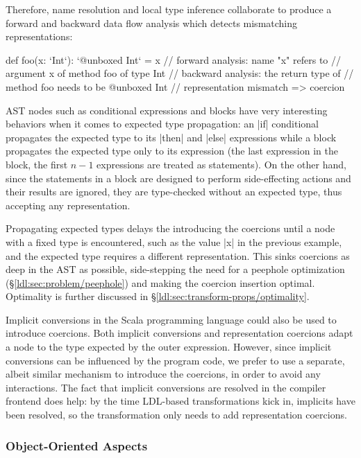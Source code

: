 Therefore, name resolution and local type inference collaborate to produce a forward and backward data flow analysis which detects mismatching representations:

\begin{lstlisting-nobreak}
 def foo(x: `Int`):  `@unboxed Int` =
   x // forward analysis: name "x" refers to
      //     argument x of method foo of type Int
      // backward analysis: the return type of
      //     method foo needs to be @unboxed Int
      // representation mismatch => coercion
\end{lstlisting-nobreak}

AST nodes such as conditional expressions and blocks have very interesting behaviors when it comes to expected type propagation: an |if| conditional propagates the expected type to its |then| and |else| expressions while a block propagates the expected type only to its expression (the last expression in the block, the first $n-1$ expressions are treated as statements). On the other hand, since the statements in a block are designed to perform side-effecting actions and their results are ignored, they are type-checked without an expected type, thus accepting any representation.

Propagating expected types delays the introducing the coercions until a node with a fixed type is encountered, such as the value |x| in the previous example, and the expected type requires a different representation. This sinks coercions as deep in the AST as possible, side-stepping the need for a peephole optimization (\S\ref{ldl:sec:problem/peephole}) and making the coercion insertion optimal. Optimality is further discussed in \S\ref{ldl:sec:transform-props/optimality}.

Implicit conversions in the Scala programming language could also be used to introduce coercions. Both implicit conversions and representation coercions adapt a node to the type expected by the outer expression. However, since implicit conversions can be influenced by the program code, we prefer to use a separate, albeit similar mechanism to introduce the coercions, in order to avoid any interactions. The fact that implicit conversions are resolved in the compiler frontend does help: by the time LDL-based transformations kick in, implicits have been resolved, so the transformation only needs to add representation coercions.

\subsubsection*{Object-Oriented Aspects}
\label{ldl:subsec:coerce-object-oriented}

